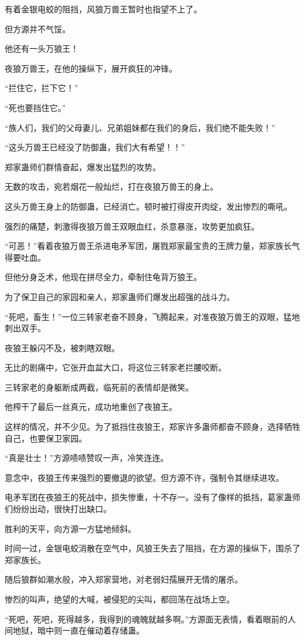 \begin{this_body}
有着金银电蛟的阻挡，风狼万兽王暂时也指望不上了。

但方源并不气馁。

他还有一头万狼王！

夜狼万兽王，在他的操纵下，展开疯狂的冲锋。

“拦住它，拦下它！”

“死也要挡住它。”

“族人们，我们的父母妻儿、兄弟姐妹都在我们的身后，我们绝不能失败！”

“这头万兽王已经没了防御蛊，我们大有希望！！”

郑家蛊师们群情奋起，爆发出猛烈的攻势。

无数的攻击，宛若烟花一般灿烂，打在夜狼万兽王的身上。

这头万兽王身上的防御蛊，已经消亡。顿时被打得皮开肉绽，发出惨烈的嘶吼。

强烈的痛楚，刺激得夜狼万兽王双眼血红，杀意暴涨，攻势更加疯狂。

“可恶！”看着夜狼万兽王杀进电矛军团，屠戮郑家最宝贵的王牌力量，郑家族长气得要吐血。

但他分身乏术，他现在拼尽全力，牵制住龟背万狼王。

为了保卫自己的家园和亲人，郑家蛊师们爆发出超强的战斗力。

“死吧，畜生！”一位三转家老奋不顾身，飞腾起来，对准夜狼万兽王的双眼，猛地刺出双手。

夜狼王躲闪不及，被刺瞎双眼。

无比的剧痛中，它张开血盆大口，将这位三转家老拦腰咬断。

三转家老的身躯断成两截，临死前的表情却是微笑。

他榨干了最后一丝真元，成功地重创了夜狼王。

这样的情况，并不少见。为了抵挡住夜狼王，郑家许多蛊师都奋不顾身，选择牺牲自己，也要保卫家园。

“真是壮士！”方源啧啧赞叹一声，冷笑连连。

意念中，夜狼王传来强烈的要撤退的欲望。但方源不许，强制令其继续进攻。

电矛军团在夜狼王的死战中，损失惨重，十不存一。没有了像样的抵挡，葛家蛊师们纷纷出动，很快打出缺口。

胜利的天平，向方源一方猛地倾斜。

时间一过，金银电蛟消散在空气中，风狼王失去了阻挡，在方源的操纵下，围杀了郑家族长。

随后狼群如潮水般，冲入郑家营地，对老弱妇孺展开无情的屠杀。

惨烈的叫声，绝望的大喊，被侵犯的尖叫，都回荡在战场上空。

“死吧，死吧，死得越多，我得到的魂魄就越多啊。”方源面无表情，看着眼前的人间地狱，暗中则一直在催动着存储蛊。

\end{this_body}

